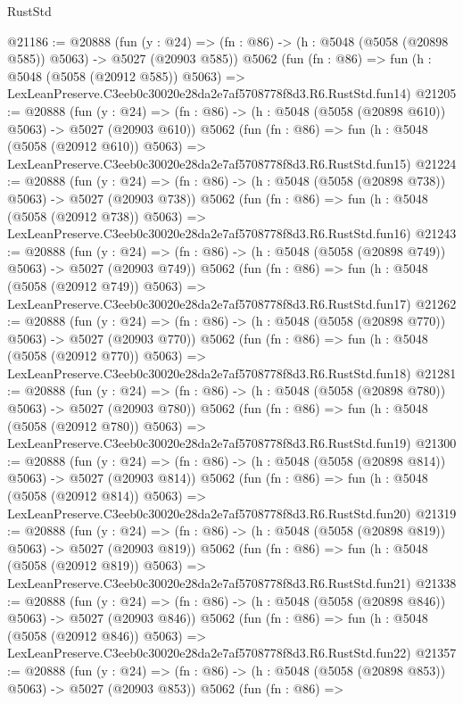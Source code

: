 \begin{lexlean}{RustStd}
\begin{coremodule}
@21186 := @20888
    (fun (y : @24) => (fn : @86) -> (h : @5048 (@5058 (@20898 @585)) @5063) -> @5027 (@20903 @585))
    @5062
    (fun (fn : @86) =>
    fun (h : @5048 (@5058 (@20912 @585)) @5063) =>
    LexLeanPreserve.C3eeb0c30020e28da2e7af5708778f8d3.R6.RustStd.fun14)
@21205 := @20888
    (fun (y : @24) => (fn : @86) -> (h : @5048 (@5058 (@20898 @610)) @5063) -> @5027 (@20903 @610))
    @5062
    (fun (fn : @86) =>
    fun (h : @5048 (@5058 (@20912 @610)) @5063) =>
    LexLeanPreserve.C3eeb0c30020e28da2e7af5708778f8d3.R6.RustStd.fun15)
@21224 := @20888
    (fun (y : @24) => (fn : @86) -> (h : @5048 (@5058 (@20898 @738)) @5063) -> @5027 (@20903 @738))
    @5062
    (fun (fn : @86) =>
    fun (h : @5048 (@5058 (@20912 @738)) @5063) =>
    LexLeanPreserve.C3eeb0c30020e28da2e7af5708778f8d3.R6.RustStd.fun16)
@21243 := @20888
    (fun (y : @24) => (fn : @86) -> (h : @5048 (@5058 (@20898 @749)) @5063) -> @5027 (@20903 @749))
    @5062
    (fun (fn : @86) =>
    fun (h : @5048 (@5058 (@20912 @749)) @5063) =>
    LexLeanPreserve.C3eeb0c30020e28da2e7af5708778f8d3.R6.RustStd.fun17)
@21262 := @20888
    (fun (y : @24) => (fn : @86) -> (h : @5048 (@5058 (@20898 @770)) @5063) -> @5027 (@20903 @770))
    @5062
    (fun (fn : @86) =>
    fun (h : @5048 (@5058 (@20912 @770)) @5063) =>
    LexLeanPreserve.C3eeb0c30020e28da2e7af5708778f8d3.R6.RustStd.fun18)
@21281 := @20888
    (fun (y : @24) => (fn : @86) -> (h : @5048 (@5058 (@20898 @780)) @5063) -> @5027 (@20903 @780))
    @5062
    (fun (fn : @86) =>
    fun (h : @5048 (@5058 (@20912 @780)) @5063) =>
    LexLeanPreserve.C3eeb0c30020e28da2e7af5708778f8d3.R6.RustStd.fun19)
@21300 := @20888
    (fun (y : @24) => (fn : @86) -> (h : @5048 (@5058 (@20898 @814)) @5063) -> @5027 (@20903 @814))
    @5062
    (fun (fn : @86) =>
    fun (h : @5048 (@5058 (@20912 @814)) @5063) =>
    LexLeanPreserve.C3eeb0c30020e28da2e7af5708778f8d3.R6.RustStd.fun20)
@21319 := @20888
    (fun (y : @24) => (fn : @86) -> (h : @5048 (@5058 (@20898 @819)) @5063) -> @5027 (@20903 @819))
    @5062
    (fun (fn : @86) =>
    fun (h : @5048 (@5058 (@20912 @819)) @5063) =>
    LexLeanPreserve.C3eeb0c30020e28da2e7af5708778f8d3.R6.RustStd.fun21)
@21338 := @20888
    (fun (y : @24) => (fn : @86) -> (h : @5048 (@5058 (@20898 @846)) @5063) -> @5027 (@20903 @846))
    @5062
    (fun (fn : @86) =>
    fun (h : @5048 (@5058 (@20912 @846)) @5063) =>
    LexLeanPreserve.C3eeb0c30020e28da2e7af5708778f8d3.R6.RustStd.fun22)
@21357 := @20888
    (fun (y : @24) => (fn : @86) -> (h : @5048 (@5058 (@20898 @853)) @5063) -> @5027 (@20903 @853))
    @5062
    (fun (fn : @86) =>

\end{coremodule}
\end{lexlean}
